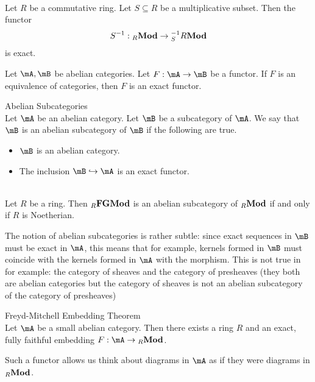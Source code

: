 \documentclass[a4paper]{article}
\begin{document}
\begin{eg}{}{}\\
Let $R$ be a commutative ring. Let $S\subseteq R$ be a multiplicative subset. Then the functor $$S^{-1}:{_R}\bold{Mod}\to{_S^{-1}R}\bold{Mod}$$ is exact. 
\end{eg}

\begin{lmm}{}{} Let $\mA,\mB$ be abelian categories. Let $F:\mA\to\mB$ be a functor. If $F$ is an equivalence of categories, then $F$ is an exact functor. 
\end{lmm}

\begin{defn}{Abelian Subcategories}{}\\
Let $\mA$ be an abelian category. Let $\mB$ be a subcategory of $\mA$. We say that $\mB$ is an abelian subcategory of $\mB$ if the following are true. 
\begin{itemize}
\item $\mB$ is an abelian category. 
\item The inclusion $\mB\hookrightarrow\mA$ is an exact functor. 
\end{itemize}
\end{defn}

\begin{eg}{}{}\\
Let $R$ be a ring. Then ${_R}\bold{FGMod}$ is an abelian subcategory of ${_R}\bold{Mod}$ if and only if $R$ is Noetherian. 
\end{eg}

The notion of abelian subcategories is rather subtle: since exact sequences in $\mB$ must be exact in $\mA$, this means that for example, kernels formed in $\mB$ must coincide with the kernels formed in $\mA$ with the morphism. This is not true in for example: the category of sheaves and the category of presheaves (they both are abelian categories but the category of sheaves is not an abelian subcategory of the category of presheaves)

\begin{thm}{Freyd-Mitchell Embedding Theorem}{}\\
Let $\mA$ be a small abelian category. Then there exists a ring $R$ and an exact, fully faithful embedding $F:\mA\to{_R\bold{Mod}}$. 
\end{thm}

Such a functor allows us think about diagrams in $\mA$ as if they were diagrams in ${_R\bold{Mod}}$. 
\end{document}

